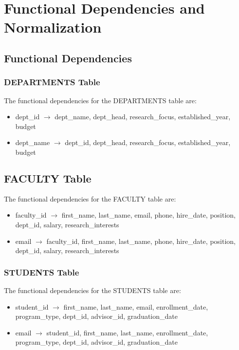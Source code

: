 \documentclass[12pt,a4paper]{article}
\begin{document}
\section{Functional Dependencies and Normalization}

\subsection{Functional Dependencies}

\subsubsection{DEPARTMENTS Table}
The functional dependencies for the DEPARTMENTS table are:
\begin{itemize}
    \item dept\_id $\rightarrow$ dept\_name, dept\_head, research\_focus, established\_year, budget
    \item dept\_name $\rightarrow$ dept\_id, dept\_head, research\_focus, established\_year, budget
\end{itemize}

\subsection{FACULTY Table}
The functional dependencies for the FACULTY table are:
\begin{itemize}
    \item faculty\_id $\rightarrow$ first\_name, last\_name, email, phone, hire\_date, position, dept\_id, salary, research\_interests
    \item email $\rightarrow$ faculty\_id, first\_name, last\_name, phone, hire\_date, position, dept\_id, salary, research\_interests
\end{itemize}

\subsubsection{STUDENTS Table}
The functional dependencies for the STUDENTS table are:
\begin{itemize}
    \item student\_id $\rightarrow$ first\_name, last\_name, email, enrollment\_date, program\_type, dept\_id, advisor\_id, graduation\_date
    \item email $\rightarrow$ student\_id, first\_name, last\_name, enrollment\_date, program\_type, dept\_id, advisor\_id, graduation\_date
\end{itemize}
\end{document}
